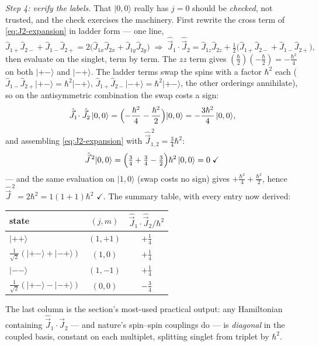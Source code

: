 \documentclass[11pt]{article}
\theoremstyle{plain}
\theoremstyle{definition}
\theoremstyle{remark}
\newcommand{\op}[1]{\hat{#1}}
\newcommand{\ket}[1]{\lvert #1 \rangle}
\begin{document}
\emph{Step 4: verify the labels.} That $\ket{0,0}$ really has
$j = 0$ should be \emph{checked}, not trusted, and the check
exercises the machinery. First rewrite the cross term of
\eqref{eq:J2-expansion} in ladder form --- one line,
\begin{equation}
  \op J_{1+}\op J_{2-} + \op J_{1-}\op J_{2+}
  = 2\bigl(\op J_{1x}\op J_{2x} + \op J_{1y}\op J_{2y}\bigr)
  \;\Longrightarrow\;
  \op{\vec J}_1\!\cdot\op{\vec J}_2
  = \op J_{1z}\op J_{2z}
  + \tfrac12\bigl(
      \op J_{1+}\op J_{2-} + \op J_{1-}\op J_{2+}
    \bigr),
  \label{eq:dot-ladder}
\end{equation}
then evaluate on the singlet, term by term. The $z z$ term gives
$(\tfrac\hbar2)(-\tfrac\hbar2) = -\tfrac{\hbar^2}4$ on both
$\ket{+-}$ and $\ket{-+}$. The ladder terms swap the spins with a
factor $\hbar^2$ each ($\op J_{1-}\op J_{2+}\ket{+-} =
\hbar^2\ket{-+}$, $\op J_{1+}\op J_{2-}\ket{-+} = \hbar^2\ket{+-}$,
the other orderings annihilate), so on the antisymmetric
combination the swap costs a sign:
\begin{equation}
  \op{\vec J}_1\!\cdot\op{\vec J}_2\,\ket{0,0}
  = \Bigl(-\frac{\hbar^2}{4} - \frac{\hbar^2}{2}\Bigr)\ket{0,0}
  = -\frac{3\hbar^2}{4}\,\ket{0,0},
\end{equation}
and assembling \eqref{eq:J2-expansion} with
$\op{\vec J}_{1,2}^{\,2} = \tfrac34\hbar^2$:
\begin{equation}
  \op{\vec J}^{\,2}\ket{0,0}
  = \Bigl(\tfrac34 + \tfrac34 - \tfrac32\Bigr)\hbar^2\,\ket{0,0}
  = 0
  \;\checkmark
\end{equation}
--- and the same evaluation on $\ket{1,0}$ (swap costs no sign)
gives $+\tfrac{\hbar^2}4 + \tfrac{\hbar^2}2$, hence
$\op{\vec J}^{\,2} = 2\hbar^2 = 1(1{+}1)\hbar^2$ $\checkmark$. The
summary table, with every entry now derived:
\begin{center}
\begin{tabular}{lcc}
\toprule
state & $(j, m)$ & $\op{\vec J}_1\!\cdot\op{\vec J}_2 / \hbar^2$ \\
\midrule
$\ket{++}$ & $(1, +1)$ & $+\tfrac14$ \\
$\tfrac{1}{\sqrt2}(\ket{+-} + \ket{-+})$ & $(1, 0)$ & $+\tfrac14$ \\
$\ket{--}$ & $(1, -1)$ & $+\tfrac14$ \\
$\tfrac{1}{\sqrt2}(\ket{+-} - \ket{-+})$ & $(0, 0)$ & $-\tfrac34$ \\
\bottomrule
\end{tabular}
\end{center}
The last column is the section's most-used practical output: any
Hamiltonian containing $\op{\vec J}_1\!\cdot\op{\vec J}_2$ --- and
nature's spin--spin couplings do --- is \emph{diagonal} in the
coupled basis, constant on each multiplet, splitting singlet from
triplet by $\hbar^2$.
\end{document}
